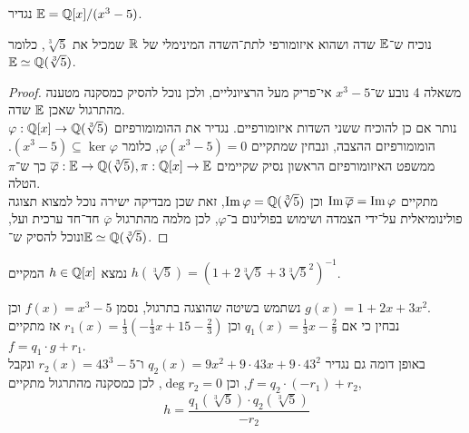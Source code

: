 \question{}
נגדיר $\mathbb{E} = \mathbb{Q}[x] / (x^3 - 5)$.

\subquestion{}
נוכיח ש־$\mathbb{E}$ שדה ושהוא איזומורפי לתת־השדה המינימלי של $\mathbb{R}$ שמכיל את $\sqrt[3]{5}$, כלומר $\mathbb{E} \simeq \mathbb{Q}(\sqrt[3]{5})$.
\begin{proof}
	משאלה 4 נובע ש־$x^3 - 5$ אי־פריק מעל הרציונליים, ולכן נוכל להסיק כמסקנה מטענה מהתרגול שאכן $\mathbb{E}$ שדה. \\
	נותר אם כן להוכיח ששני השדות איזומורפיים.
	נגדיר את ההומומורפיזם $\varphi : \mathbb{Q}[x] \to \mathbb{Q}(\sqrt[3]{5})$ הומומורפיזם ההצבה, ונבחין שמתקיים $\varphi(x^3 - 5) = 0$, כלומר $(x^3 - 5) \subseteq \ker \varphi$.
	ממשפט האיזומורפיזם הראשון נסיק שקיימים $\overline{\varphi} : \mathbb{E} \to \mathbb{Q}(\sqrt[3]{5}), \pi : \mathbb{Q}[x] \to \mathbb{E}$ כך ש־$\pi$ הטלה. \\
	מתקיים $\operatorname{Im} \overline{\varphi} = \operatorname{Im} \varphi$ וכן $\operatorname{Im} \varphi = \mathbb{Q}(\sqrt[3]{5})$, זאת שכן מבדיקה ישירה נוכל למצוא תצוגה פולינומיאלית על־ידי הצמדה ושימוש בפולינום ב־$\varphi$,
	לכן מלמה מהתרגול $\overline{\varphi}$ חד־חד ערכית ועל, ונוכל להסיק ש־$\mathbb{E} \simeq \mathbb{Q}(\sqrt[3]{5})$.
\end{proof}

\subquestion{}
נמצא $h \in \mathbb{Q}[x]$ המקיים $h(\sqrt[3]{5}) = {\left(1 + 2\sqrt[3]{5} + 3 {\sqrt[3]{5}}^2\right)}^{-1}$.
\begin{solution}
	נשתמש בשיטה שהוצגה בתרגול, נסמן $f(x) = x^3 - 5$ וכן $g(x) = 1 + 2x + 3x^2$. \\
	נבחין כי אם $q_1(x) = \frac{1}{3} x - \frac{2}{9}$ וכן $r_1(x) = \frac{1}{3} (-\frac{1}{3}x + 15 - \frac{2}{3})$ אז מתקיים $f = q_1 \cdot g + r_1$. \\
	באופן דומה גם נגדיר $q_2(x) = 9x^2 + 9 \cdot 43x + 9 \cdot 43^2$ ו־$r_2(x) = 43^3 - 5$ ונקבל $f = q_2 \cdot (-r_1) + r_2$, וכן $\deg r_2 = 0$, לכן כמסקנה מהתרגול מתקיים,
	\[
		h
		= \frac{q_1(\sqrt[3]{5}) \cdot q_2(\sqrt[3]{5})}{-r_2}
	\]
\end{solution}


